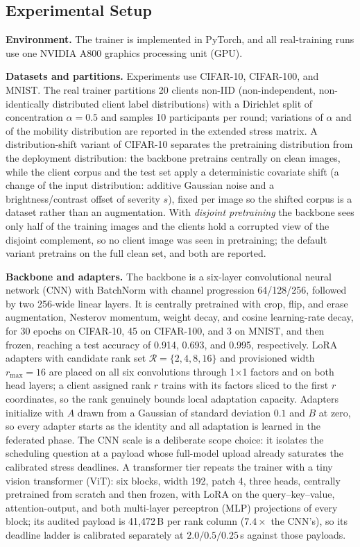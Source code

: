 \documentclass[a4paper,fleqn]{cas-dc}
\begin{document}
\subsection{Experimental Setup}
\textbf{Environment.} The trainer is implemented in PyTorch, and all real-training runs use one NVIDIA A800 graphics processing unit (GPU).
\par
\textbf{Datasets and partitions.} Experiments use CIFAR-10, CIFAR-100, and MNIST. The real trainer partitions 20 clients non-IID (non-independent, non-identically distributed client label distributions) with a Dirichlet split of concentration $\alpha=0.5$ and samples 10 participants per round; variations of $\alpha$ and of the mobility distribution are reported in the extended stress matrix. A distribution-shift variant of CIFAR-10 separates the pretraining distribution from the deployment distribution: the backbone pretrains centrally on clean images, while the client corpus and the test set apply a deterministic covariate shift (a change of the input distribution: additive Gaussian noise and a brightness/contrast offset of severity $s$), fixed per image so the shifted corpus is a dataset rather than an augmentation. With \emph{disjoint pretraining} the backbone sees only half of the training images and the clients hold a corrupted view of the disjoint complement, so no client image was seen in pretraining; the default variant pretrains on the full clean set, and both are reported.
\par
\textbf{Backbone and adapters.} The backbone is a six-layer convolutional neural network (CNN) with BatchNorm with channel progression 64/128/256, followed by two 256-wide linear layers. It is centrally pretrained with crop, flip, and erase augmentation, Nesterov momentum, weight decay, and cosine learning-rate decay, for 30 epochs on CIFAR-10, 45 on CIFAR-100, and 3 on MNIST, and then frozen, reaching a test accuracy of 0.914, 0.693, and 0.995, respectively. LoRA adapters with candidate rank set $\mathcal R=\{2,4,8,16\}$ and provisioned width $r_{\max}=16$ are placed on all six convolutions through 1$\times$1 factors and on both head layers; a client assigned rank $r$ trains with its factors sliced to the first $r$ coordinates, so the rank genuinely bounds local adaptation capacity. Adapters initialize with $A$ drawn from a Gaussian of standard deviation $0.1$ and $B$ at zero, so every adapter starts as the identity and all adaptation is learned in the federated phase. The CNN scale is a deliberate scope choice: it isolates the scheduling question at a payload whose full-model upload already saturates the calibrated stress deadlines. A transformer tier repeats the trainer with a tiny vision transformer (ViT): six blocks, width 192, patch 4, three heads, centrally pretrained from scratch and then frozen, with LoRA on the query--key--value, attention-output, and both multi-layer perceptron (MLP) projections of every block; its audited payload is 41{,}472\,B per rank column ($7.4\times$ the CNN's), so its deadline ladder is calibrated separately at $2.0/0.5/0.25$\,s against those payloads.
\end{document}
